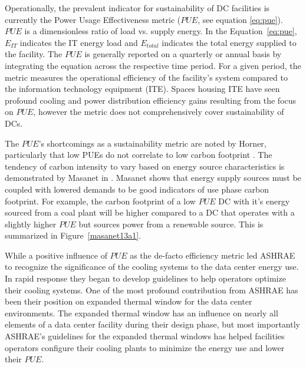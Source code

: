     
    
    Operationally, the prevalent indicator for sustainability of DC facilities is currently the Power Usage Effectiveness metric ($PUE$, see equation \ref{eq:pue}). $PUE$ is a dimensionless ratio of load vs. supply energy.   In the Equation~\ref{eq:pue}, $E_{IT}$ indicates the IT energy load and $E_{total}$ indicates the total energy supplied to the facility. The $PUE$ is generally reported on a quarterly or annual basis by integrating the equation across the respective time period. For a given period, the metric measures the operational efficiency of the facility's system compared to the information technology equipment (ITE). Spaces housing ITE have seen profound cooling and power distribution efficiency gains resulting from the focus on $PUE$, however the metric does not comprehensively cover sustainability of DCs.
    
    
    
    The $PUE$'s shortcomings as a sustainability metric are noted by Horner, particularly that low PUEs do not correlate to low carbon footprint \cite{Horner16a}. The tendency of carbon intensity to vary based on energy source characteristics is demonstrated by Masanet in \cite{Masanet13a}. Masanet shows that energy supply sources must be coupled with lowered demands to be good indicators of use phase carbon footprint. For example, the carbon footprint of a low $PUE$ DC with it's energy sourced from a coal plant will be higher compared to a DC that operates with a slightly higher $PUE$ but sources power from a renewable source. This is summarized in Figure~\ref{masanet13a1}.
    
    
    
    While a positive influence of $PUE$ as the de-facto efficiency metric led ASHRAE to recognize the significance of the cooling systems to the data center energy use. In rapid response they began to develop guidelines to help operators optimize their cooling systems. One of the most profound contribution from ASHRAE has been their position on expanded thermal window for the data center environments. The expanded thermal window has an influence on nearly all elements of a data center facility during their design phase, but most importantly ASHRAE's guidelines for the expanded thermal windows has helped facilities operators configure their cooling plants to minimize the energy use and lower their $PUE$.
    
